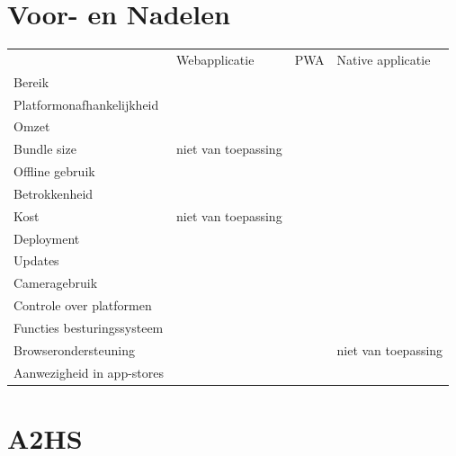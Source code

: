 \documentclass[a0,portrait]{a0poster}
\begin{document}
\begin{multicols}{2}
\section*{Voor- en Nadelen}
\color{black} 
		\begin{tabular}{llll}
			                         			  & Webapplicatie 	 				 & PWA								 & Native applicatie \\
				Bereik                   		   & \cellcolor{green!40}      		 & \cellcolor{green!40}			& \cellcolor{red!50}\\
				Platformonafhankelijkheid   & \cellcolor{green!40}      	  & \cellcolor{orange!50}		& \cellcolor{red!50}\\
				Omzet   						  & \cellcolor{red!50}      		 & \cellcolor{orange!50}		& \cellcolor{green!40}\\
				Bundle size						  & niet van toepassing      		& \cellcolor{green!40}		   & \cellcolor{red!50}\\
				Offline gebruik					 & \cellcolor{red!50}      		    & \cellcolor{green!40}			& \cellcolor{green!40}\\
				Betrokkenheid 					& \cellcolor{red!50}      		   & \cellcolor{orange!50}		 & \cellcolor{green!40}\\
				Kost 								& niet van toepassing     		  & \cellcolor{green!40}		 & \cellcolor{red!50}\\
				Deployment 						& \cellcolor{green!40}      	  & \cellcolor{green!40}		 & \cellcolor{red!50}\\
				Updates	   						& \cellcolor{green!40}      	  & \cellcolor{green!40}		 & \cellcolor{red!50}\\
				Cameragebruik                  & \cellcolor{red!50}      		 & \cellcolor{red!50}			& \cellcolor{green!40}\\
				Controle over platformen   	& \cellcolor{red!50}      	  & \cellcolor{red!50}		& \cellcolor{green!40}\\
				Functies besturingssysteem  & \cellcolor{red!50}      		 & \cellcolor{orange!50}		& \cellcolor{green!40}\\
				Browserondersteuning		 & \cellcolor{green!40}     		& \cellcolor{orange!50}		   &niet van toepassing\\
				Aanwezigheid in app-stores	 & \cellcolor{red!50}      		    & \cellcolor{red!50}			& \cellcolor{green!40}\\
		\end{tabular}

\color{Black}
\color{HoGentAccent1} 
\section*{A2HS}
\color{black}
	

\end{multicols}
\end{document}
